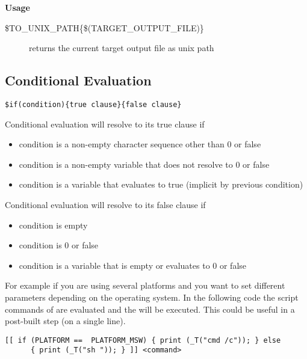 \textbf{Usage}
\begin{description}
\item[{\footnotesize \$TO\_UNIX\_PATH\{\$(TARGET\_OUTPUT\_FILE)\}}] returns the current target output file as unix path
\end{description}

\subsection{Conditional Evaluation}

\begin{lstlisting}
$if(condition){true clause}{false clause}
\end{lstlisting}

Conditional evaluation will resolve to its true clause if

\begin{itemize}
\item condition is a non-empty character sequence other than 0 or false
\item condition is a non-empty variable that does not resolve to 0 or false
\item condition is a variable that evaluates to true (implicit by previous condition)
\end{itemize}

Conditional evaluation will resolve to its false clause if

\begin{itemize}
\item condition is empty
\item condition is 0 or false
\item condition is a variable that is empty or evaluates to 0 or false
\end{itemize}



For example if you are using several platforms and you want to set different parameters depending on the operating system. In the following code the script commands of \codeline{[[ ]]} are evaluated and the  will be executed. This could be useful in a post-built step (on a single line).

\begin{lstlisting}
[[ if (PLATFORM ==  PLATFORM_MSW) { print (_T("cmd /c")); } else
      { print (_T("sh ")); } ]] <command>
\end{lstlisting}

